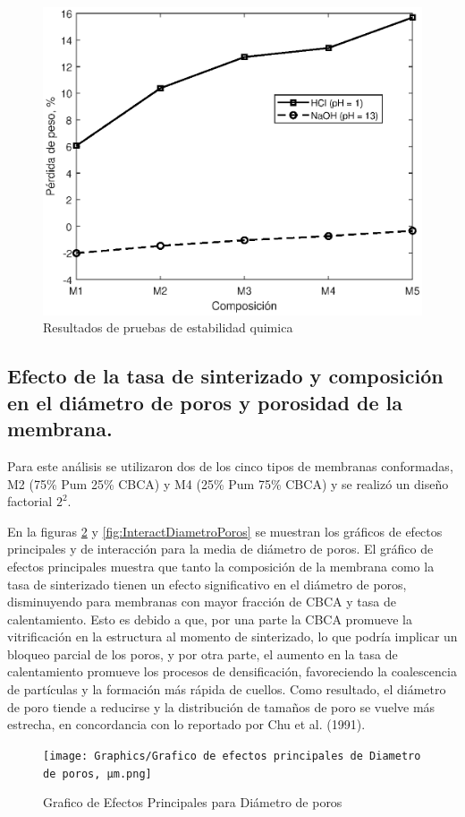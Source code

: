 \documentclass{article}
\begin{document}
\begin{figure}[!htbp]
    \centering
    \includegraphics[width=0.5\linewidth]{Graphics/ChemStability.eps}
    \caption{Resultados de pruebas de estabilidad quimica}
    \label{fig:EstabilidadQuimica}
\end{figure}

\subsection{Efecto de la tasa de sinterizado y composición en el diámetro de poros y porosidad de la membrana. }

Para este análisis se utilizaron dos de los cinco tipos de membranas 
conformadas, M2 (75\% Pum 25\% CBCA) y M4 (25\% Pum 75\% CBCA) y se 
realizó un diseño factorial $2^2$.

En la figuras \ref{fig:EfectosPrinDiametroPoros} y \ref{fig:InteractDiametroPoros} 
se muestran los gráficos de efectos principales 
y de interacción para la media de diámetro de poros. El gráfico de 
efectos principales muestra que tanto la composición de la membrana 
como la tasa de sinterizado tienen un efecto significativo en el 
diámetro de poros, disminuyendo para membranas con mayor fracción de 
CBCA y tasa de calentamiento. Esto es debido a que, por una parte la 
CBCA promueve la vitrificación en la estructura al momento de 
sinterizado, lo que podría implicar un bloqueo parcial de los poros, 
y por otra parte, el aumento en la tasa de calentamiento promueve los 
procesos de densificación, favoreciendo la coalescencia de partículas 
y la formación más rápida de cuellos. Como resultado, el diámetro de 
poro tiende a reducirse y la distribución de tamaños de poro se 
vuelve más estrecha, en concordancia con lo reportado por Chu et al. (1991). 

\begin{figure}[!htbp]
    \centering
    \texttt{[image: Graphics/Grafico de efectos principales de Diametro de poros, μm.png]}
    \caption{Grafico de Efectos Principales para Diámetro de poros}
    \label{fig:EfectosPrinDiametroPoros}
\end{figure}
\end{document}

